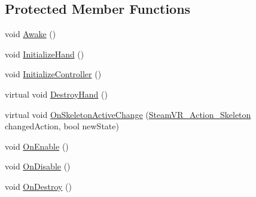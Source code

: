 \subsection*{Protected Member Functions}
\begin{DoxyCompactItemize}
\item 
void \mbox{\hyperlink{class_valve_1_1_v_r_1_1_interaction_system_1_1_render_model_aaba23a0c406c604e2ca10c0f16ae32c7}{Awake}} ()
\item 
void \mbox{\hyperlink{class_valve_1_1_v_r_1_1_interaction_system_1_1_render_model_a7753aa2744501093eb2beacf6afa8815}{Initialize\+Hand}} ()
\item 
void \mbox{\hyperlink{class_valve_1_1_v_r_1_1_interaction_system_1_1_render_model_a06f0ce57f5e18097692d47ca59d211f4}{Initialize\+Controller}} ()
\item 
virtual void \mbox{\hyperlink{class_valve_1_1_v_r_1_1_interaction_system_1_1_render_model_a980dbe20ed862ee2ad56b94fe2ffddac}{Destroy\+Hand}} ()
\item 
virtual void \mbox{\hyperlink{class_valve_1_1_v_r_1_1_interaction_system_1_1_render_model_a7b5452ed4daa0024d8f9233c3577694c}{On\+Skeleton\+Active\+Change}} (\mbox{\hyperlink{class_valve_1_1_v_r_1_1_steam_v_r___action___skeleton}{Steam\+V\+R\+\_\+\+Action\+\_\+\+Skeleton}} changed\+Action, bool new\+State)
\item 
void \mbox{\hyperlink{class_valve_1_1_v_r_1_1_interaction_system_1_1_render_model_a409e2b64904eed7e9941d2a2ffd790cc}{On\+Enable}} ()
\item 
void \mbox{\hyperlink{class_valve_1_1_v_r_1_1_interaction_system_1_1_render_model_ac4c6fdfbc368a1ba7cb61e8372c92937}{On\+Disable}} ()
\item 
void \mbox{\hyperlink{class_valve_1_1_v_r_1_1_interaction_system_1_1_render_model_a26fe308a8c7213d63ff697b316bc4124}{On\+Destroy}} ()
\end{DoxyCompactItemize}

